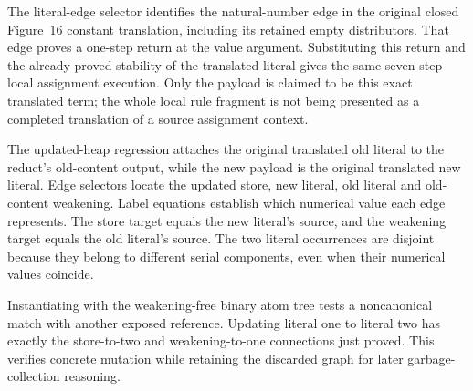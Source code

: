 The literal-edge selector identifies the natural-number edge in the original
closed Figure~16 constant translation, including its retained empty
distributors. That edge proves a one-step return at the value argument.
Substituting this return and the already proved stability of the translated
literal gives the same seven-step local assignment execution. Only the
payload is claimed to be this exact translated term; the whole local rule
fragment is not being presented as a completed translation of a source
assignment context.




The updated-heap regression attaches the original translated old literal
to the reduct's old-content output, while the new payload is the original
translated new literal. Edge selectors locate the updated store, new
literal, old literal and old-content weakening. Label equations establish
which numerical value each edge represents. The store target equals the
new literal's source, and the weakening target equals the old literal's
source. The two literal occurrences are disjoint because they belong to
different serial components, even when their numerical values coincide.









Instantiating with the weakening-free binary atom tree tests a noncanonical
match with another exposed reference. Updating literal one to literal two
has exactly the store-to-two and weakening-to-one connections just proved.
This verifies concrete mutation while retaining the discarded graph for
later garbage-collection reasoning.

